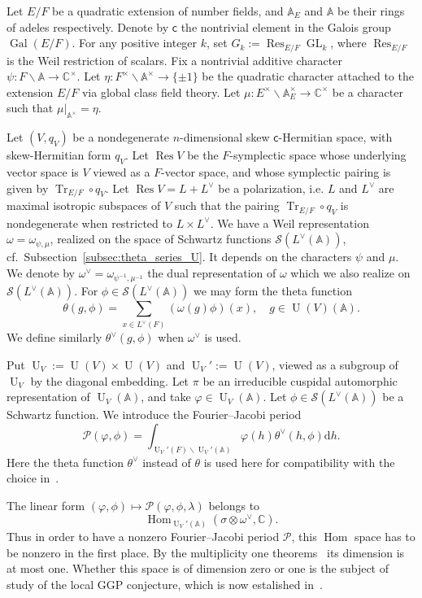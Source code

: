 \documentclass[letterpaper,11pt]{amsart}
\newcommand{\bA}{\mathbb{A}}
\newcommand{\C}{\mathbb{C}}
\newcommand{\cP}{\mathcal{P}}
\newcommand{\cS}{\mathcal{S}}
\newcommand{\rd}{\mathrm{d}}
\newcommand{\bs}{\backslash}
\newcommand{\<}{\negthickspace}
\DeclareMathOperator{\Gal}{Gal}
\DeclareMathOperator{\Tr}{Tr}
\DeclareMathOperator{\GL}{GL}
\DeclareMathOperator{\U}{U}
\DeclareMathOperator{\Res}{Res}
\DeclareMathOperator{\Hom}{Hom}
\theoremstyle{definition}
\theoremstyle{plain}
\theoremstyle{remark}
\numberwithin{equation}{section}
\begin{document}
Let $E/F$ be a quadratic extension of number fields, and $\bA_E$ and $\bA$
be their rings of adeles respectively. Denote by $\mathsf{c}$ the nontrivial
element in the Galois group $\Gal(E/F)$. For any positive integer $k$, set
$G_k:= \Res_{E/F} \GL_k$, where $\Res_{E/F}$ is the Weil restriction of scalars. Fix a nontrivial additive character
$\psi: F \bs \bA \to \C^\times$. Let $\eta: F^\times \bs \bA^\times \to
\{ \pm 1 \}$ be the quadratic character attached to the extension $E/F$ via  global class field theory. Let $\mu: E^\times \bs \bA_E^\times
\to \C^\times$ be a character such that $\mu|_{\bA^\times} = \eta$.


Let $(V, q_V)$ be a nondegenerate $n$-dimensional skew
$\mathsf{c}$-Hermitian space, with
skew-Hermitian form $q_V$. Let $\Res V$ be the $F$-symplectic space whose
underlying vector space is $V$ viewed as a $F$-vector space, and
whose symplectic pairing is given by $\Tr_{E/F} \circ q_V$. Let $\Res V = L +
L^\vee$ be a polarization, i.e. $L$ and $L^\vee$ are maximal isotropic subspaces
of $V$ such that the pairing $\Tr_{E/F} \circ q_V$ is
nondegenerate when restricted to $L \times
L^\vee$. We have a Weil representation $\omega =
\omega_{\psi, \mu}$, realized on the space of Schwartz functions $\cS(L^\vee(\bA))$,
cf.~Subsection~\ref{subsec:theta_series_U}. It depends on the characters
$\psi$ and $\mu$. We denote by $\omega^\vee = \omega_{\psi^{-1}, \mu^{-1}}$ the dual
representation of $\omega$ which we also realize on $\cS(L^\vee(\bA))$. For $\phi \in \cS(L^\vee(\bA))$ we may form the theta
function
    \[
    \theta(g, \phi) = \sum_{x \in L^\vee(F)} (\omega(g) \phi)(x), \quad
    g \in \U(V)(\bA).
    \]
We define similarly $\theta^\vee(g, \phi)$ when $\omega^\vee$ is used.


Put $\U_V := \U(V) \times \U(V)$ and $\U_V' := \U(V)$, viewed as a subgroup of $\U_V$
by the diagonal embedding. Let $\pi$ be an irreducible cuspidal automorphic representation of $\U_V(\bA)$, and take $\varphi \in \U_V(\bA)$. Let $\phi \in \cS(L^\vee(\bA))$ be a Schwartz function. We introduce the Fourier--Jacobi period  
\begin{equation}
\label{eq:FJ_corank_0_intro}
    \cP(\varphi,\phi)=\int_{\U_V'(F) \backslash \U_V'(\bA)}  \varphi(h)  \theta^\vee(h,\phi) \rd h.
\end{equation}
Here the theta function $\theta^\vee$ instead of $\theta$ is used here for compatibility with the choice in~\cite{GGP}.

The linear form $(\varphi, \phi) \mapsto \cP(\varphi,
\phi,\lambda)$ belongs to
    \[
    \Hom_{\U_V'(\bA)}(\sigma \otimes \omega^\vee, \C).
    \]
Thus in order to have a nonzero Fourier--Jacobi period $\cP$, this $\Hom$
space has to be nonzero in the first place. By the multiplicity one
theorems~\cites{Sun,SZ} its dimension is at most one. Whether this space is of dimension zero or one is the subject of study of the local GGP conjecture, which is now estalished in~\cites{GI2,Xue6}. 
\end{document}

